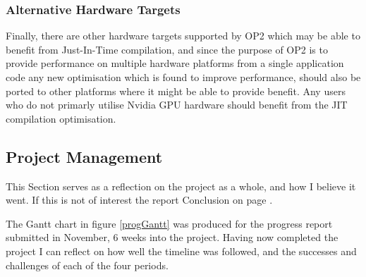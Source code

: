 \subsubsection{Alternative Hardware Targets}
Finally, there are other hardware targets supported by OP2 which may be able to benefit from Just-In-Time compilation, and since the purpose of OP2 is to provide performance on multiple hardware platforms from a single application code any new optimisation which is found to improve performance, should also be ported to other platforms where it might be able to provide benefit. Any users who do not  primarly utilise Nvidia GPU hardware should benefit from the JIT compilation optimisation.

\clearpage
\subsection{Project Management}
\label{ss:pm}
This Section serves as a reflection on the project as a whole, and how I believe it went. If this is not of interest the report Conclusion on page \pageref{s:conc}.
\par
The Gantt chart in figure \ref{progGantt} was produced for the progress report submitted in November, 6 weeks into the project. Having now completed the project I can reflect on how well the timeline was followed, and the successes and challenges of each of the four periods.
\newcommand\w{25}

